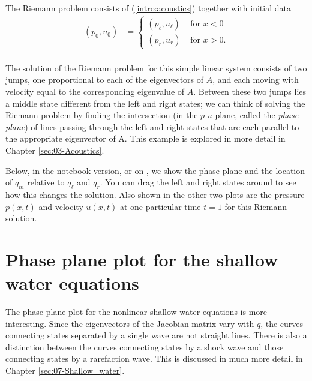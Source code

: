 \documentclass{SIAMbook2016}
\begin{document}
The Riemann problem consists of (\ref{intro:acoustics}) together with
initial data\\
\begin{align*}
    (p_0,u_0) & = \begin{cases} (p_\ell, u_\ell) & \text{ for } x<0 \\
                                (p_r, u_r) & \text{ for } x>0. \end{cases}
\end{align*}\\
The solution of the Riemann problem for this simple linear system
consists of two jumps, one proportional to each of the eigenvectors of
\(A\), and each moving with velocity equal to the corresponding
eigenvalue of \(A\). Between these two jumps lies a middle state
different from the left and right states; we can think of solving the
Riemann problem by finding the intersection (in the \(p\)-\(u\) plane,
called the \emph{phase plane}) of lines passing through the left and
right states that are each parallel to the appropriate eigenvector of A.
This example is explored in more detail in
Chapter \ref{sec:03-Acoustics}.

Below, in the notebook version, or on
, we show the phase plane and the location of \(q_m\) relative
to \(q_\ell\) and \(q_r\). You can drag the left and right states around
to see how this changes the solution. Also shown in the other two plots
are the pressure \(p(x,t)\) and velocity \(u(x,t)\) at one particular
time \(t=1\) for this Riemann solution.

            
\hypertarget{phase-plane-plot-for-the-shallow-water-equations}{%
\section{Phase plane plot for the shallow water
equations}\label{phase-plane-plot-for-the-shallow-water-equations}}

The phase plane plot for the nonlinear shallow water equations is more
interesting. Since the eigenvectors of the Jacobian matrix vary with
\(q\), the curves connecting states separated by a single wave are not
straight lines. There is also a distinction between the curves
connecting states by a shock wave and those connecting states by a
rarefaction wave. This is discussed in much more detail in
Chapter \ref{sec:07-Shallow_water}.
\end{document}
